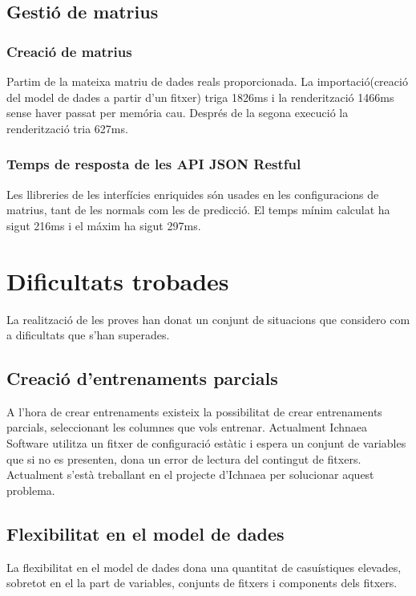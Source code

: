 \subsection*{Gesti\'{o} de matrius}
\subsubsection{Creaci\'{o} de matrius}
Partim de la mateixa matriu de dades reals proporcionada. La importaci\'{o}(creaci\'{o} del model de dades a partir d'un fitxer) triga 1826ms i la renderitzaci\'{o} 1466ms sense haver passat per mem\'{o}ria cau. Despr\'{e}s de la segona execuci\'{o} la renderitzaci\'{o} tria 627ms.

\subsubsection{Temps de resposta de les API JSON Restful}
Les llibreries de les interfícies enriquides s\'{o}n usades en les configuracions de matrius, tant de les normals com les de predicci\'{o}. El temps m\'{i}nim calculat ha sigut 216ms i el m\'{a}xim ha sigut 297ms.


\section{Dificultats trobades}
\label{sec:errorsKnown}
La realització de les proves han donat un conjunt de situacions que considero com a dificultats que s'han superades. 

\subsection*{Creació d'entrenaments parcials}
A l'hora de crear entrenaments existeix la possibilitat de crear entrenaments parcials, seleccionant les columnes que vols entrenar. Actualment Ichnaea Software utilitza un fitxer de configuració estàtic i espera un conjunt de variables que si no es presenten, dona un error de lectura del contingut de fitxers.\\

Actualment s'est\`{a} treballant en el projecte d'Ichnaea per solucionar aquest problema.

\subsection*{Flexibilitat en el model de dades}
La flexibilitat en el model de dades dona una quantitat de casuístiques elevades, sobretot en el la part de variables, conjunts de fitxers i components dels fitxers.\\

